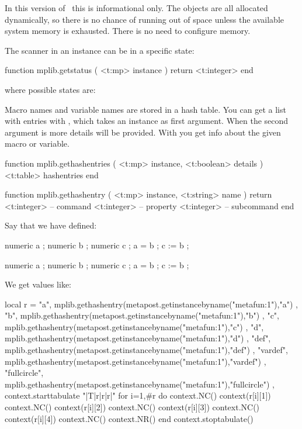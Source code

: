 In this version of \MPLIB\ this is informational only. The objects are all
allocated dynamically, so there is no chance of running out of space unless the
available system memory is exhausted. There is no need to configure memory.

The scanner in an instance can be in a specific state:

\starttyping[option=LUA]
function mplib.getstatus ( <t:mp> instance )
    return <t:integer>
end
\stoptyping

where possible states are:

\startfourrows
\stopfourrows

Macro names and variable names are stored in a hash table. You can get a list
with entries with , which takes an instance as first
argument. When the second argument is  more details will be provided.
With  you get info about the given macro or variable.

\starttyping[option=LUA]
function mplib.gethashentries ( <t:mp> instance, <t:boolean> details )
    <t:table> hashentries
end
\stoptyping

\starttyping[option=LUA]
function mplib.gethashentry ( <t:mp> instance, <t:string> name )
    return
        <t:integer> -- command
        <t:integer> -- property
        <t:integer> -- subcommand
end
\stoptyping

Say that we have defined:

\starttyping[option=MP]
numeric a ; numeric b ; numeric c ; a = b ; c := b ;
\stoptyping

\startMPcalculation
    numeric a ; numeric b ; numeric c ; a = b ; c := b ;
\stopMPcalculation

We get values like:

\startluacode
local r = {
    { "a",          mplib.gethashentry(metapost.getinstancebyname("metafun:1"),"a") },
    { "b",          mplib.gethashentry(metapost.getinstancebyname("metafun:1"),"b") },
    { "c",          mplib.gethashentry(metapost.getinstancebyname("metafun:1"),"c") },
    { "d",          mplib.gethashentry(metapost.getinstancebyname("metafun:1"),"d") },
    { "def",        mplib.gethashentry(metapost.getinstancebyname("metafun:1"),"def") },
    { "vardef",     mplib.gethashentry(metapost.getinstancebyname("metafun:1"),"vardef") },
    { "fullcircle", mplib.gethashentry(metapost.getinstancebyname("metafun:1"),"fullcircle") },
}
context.starttabulate { "|T|r|r|r|" }
for i=1,#r do
    context.NC() context(r[i][1])
    context.NC() context(r[i][2])
    context.NC() context(r[i][3])
    context.NC() context(r[i][4])
    context.NC() context.NR()
end
context.stoptabulate()
\stopluacode

